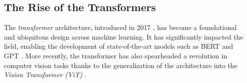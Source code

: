 \subsection{The Rise of the Transformers}\label{sec:transformer}
The \textit{transformer} architecture, introduced in 2017 \cite{NIPS_transformerPaper}, has become a foundational and ubiquitous design across machine learning. It has significantly impacted the field, enabling the development of state-of-the-art models such as BERT \cite{devlin-etal-2019-bert} and GPT \cite{radford2018improving}. More recently, the transformer has also spearheaded a revolution in computer vision tasks thanks to the generalisation of the architecture into the \textit{Vision Transformer (ViT)} \cite{vitPaper}.\\

